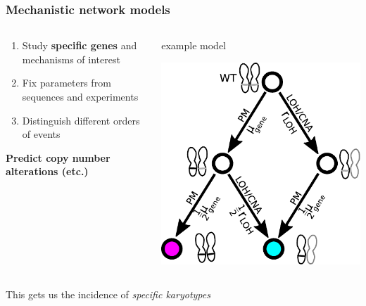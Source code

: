\documentclass{beamer}
\begin{document}
\begin{frame}
    \frametitle{Mechanistic network models}
    \begin{columns}
        \begin{column}{0.5\textwidth}
        \begin{enumerate}
            \item Study \textbf{specific genes} and mechanisms of interest
            \item Fix parameters from sequences and experiments
            \item Distinguish different orders of events
        \end{enumerate}
        \begin{center}
            \textbf{Predict copy number alterations (etc.)}
        \end{center}
        \end{column}
        \begin{column}{0.5\textwidth}
        \begin{center}
            \small{example model}
        \end{center}
            \includegraphics[width=\textwidth]{figures/diagram4}
        \end{column}
    \end{columns}

    \;

    \begin{center}
        This gets us the incidence of \emph{specific karyotypes}
    \end{center}
\end{frame}
\end{document}
